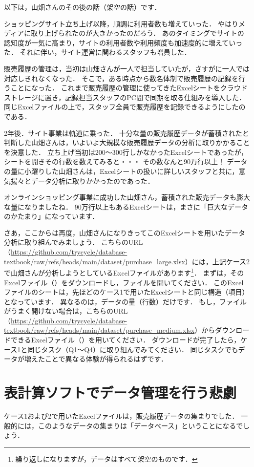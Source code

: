 以下は，山畑さんのその後の話（架空の話）です．
\begin{framed}
ショッピングサイト立ち上げ以降，順調に利用者数も増えていった．
やはりメディアに取り上げられたのが大きかったのだろう．
あのタイミングでサイトの認知度が一気に高まり，サイトの利用者数や利用頻度も加速度的に増えていった．
それに伴い，サイト運営に関わるスタッフも増員した．

販売履歴の管理は，当初は山畑さんが一人で担当していたが，さすがに一人では対応しきれなくなった．
そこで，ある時点から数名体制で販売履歴の記録を行うことになった．
これまで販売履歴の管理に使ってきたExcelシートをクラウドストレージに置き，記録担当スタッフのPC間で同期を取る仕組みを導入した．
同じExcelファイルの上で，スタッフ全員で販売履歴を記録できるようにしたのである．

2年後．サイト事業は軌道に乗った．
十分な量の販売履歴データが蓄積されたと判断した山畑さんは，いよいよ大規模な販売履歴データの分析に取りかかることを決意した．
立ち上げ当初は200〜300行しかなかったExcelシートであったが，シートを開きその行数を数えてみると・・・
その数なんと90万行以上！
データの量に小躍りした山畑さんは，Excelシートの扱いに詳しいスタッフと共に，意気揚々とデータ分析に取りかかったのであった．
\end{framed}

オンラインショッピング事業に成功した山畑さん，蓄積された販売データも膨大な量になりましたね．
90万行以上もあるExcelシートは，まさに「巨大なデータのかたまり」になっています．

さあ，ここからは再度，山畑さんになりきってこのExcelシートを用いたデータ分析に取り組んでみましょう．
こちらのURL（\url{https://github.com/trycycle/database-textbook/raw/refs/heads/main/dataset/purchase_large.xlsx}）には，上記ケース2で山畑さんが分析しようとしているExcelファイルがあります\footnote{繰り返しになりますが，データはすべて架空のものです．}．
まずは，そのExcelファイル（）をダウンロードし，ファイルを開いてください．
このExcelファイルのシートは，先ほどのケース1で用いたExcelシートと同じ構造（項目）となっています．
異なるのは，データの量（行数）だけです．
もし，ファイルがうまく開けない場合は，こちらのURL（\url{https://github.com/trycycle/database-textbook/raw/refs/heads/main/dataset/purchase_medium.xlsx}）からダウンロードできるExcelファイル（）を用いてください．
ダウンロードが完了したら，ケース1と同じタスク（Q1〜Q4）に取り組んでみてください．
同じタスクでもデータが増えたことで異なる体験が得られるはずです．


\section{表計算ソフトでデータ管理を行う悲劇}
ケース1および2で用いたExcelファイルは，販売履歴データの集まりでした．
一般的には，このようなデータの集まりは「データベース」ということになるでしょう．

